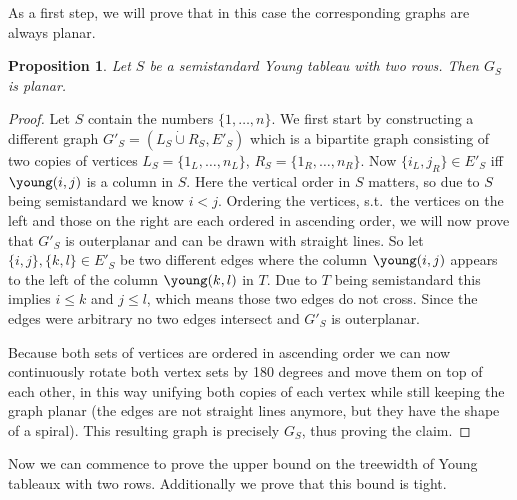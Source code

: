 \documentclass[10pt,a4paper]{article}
\numberwithin{equation}{section}
\newtheorem{proposition}[equation]{Proposition}
\theoremstyle{definition}
\begin{document}
As a first step, we will prove that in this case the corresponding graphs are always planar.
\begin{proposition}
    \label{prop:2rowplanar}
    Let $S$ be a semistandard Young tableau with two rows.
    Then $G_S$ is planar.
\end{proposition}
\begin{proof}
    Let $S$ contain the numbers $\{1, \ldots, n\}$.
    We first start by constructing a different graph $G'_S = (L_S \dot{\cup} R_S, E'_S)$ which is a bipartite graph consisting of two copies of vertices $L_S = \{1_L, \ldots, n_L\}$, $R_S = \{1_R, \ldots, n_R\}$.
    Now $\{i_L, j_R\} \in E'_S$ iff {\scriptsize $\young(i,j)$} is a column in $S$.
    Here the vertical order in $S$ matters, so due to $S$ being semistandard we know $i < j$.
    Ordering the vertices, s.t.\ the vertices on the left and those on the right are each ordered in ascending order, we will now prove that $G'_S$ is outerplanar and can be drawn with straight lines.
    So let $\{i,j\}, \{k,l\} \in E'_S$ be two different edges where the column {\scriptsize $\young(i,j)$} appears to the left of the column {\scriptsize $\young(k,l)$} in $T$.
    Due to $T$ being semistandard this implies $i \leq k$ and $j \leq l$, which means those two edges do not cross.
    Since the edges were arbitrary no two edges intersect and $G'_S$ is outerplanar.

    Because both sets of vertices are ordered in ascending order we can now continuously rotate both vertex sets by 180 degrees and move them on top of each other, in this way unifying both copies of each vertex while still keeping the graph planar (the edges are not straight lines anymore, but they have the shape of a spiral).
    This resulting graph is precisely $G_S$, thus proving the claim.
\end{proof}

Now we can commence to prove the upper bound on the treewidth of Young tableaux with two rows.
Additionally we prove that this bound is tight.
\end{document}
